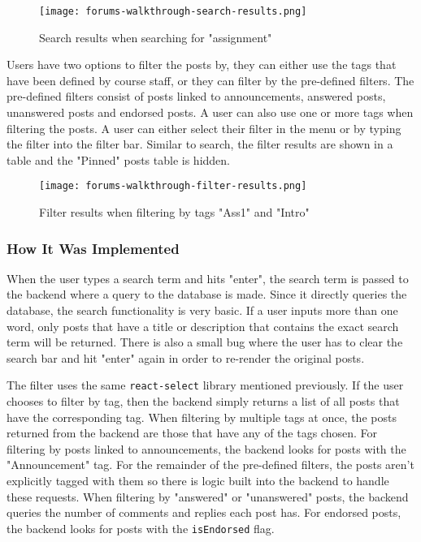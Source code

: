 \begin{figure}[h!]
    \texttt{[image: forums-walkthrough-search-results.png]}
    \centering
    \caption{Search results when searching for "assignment"}
\end{figure}

\newpage

Users have two options to filter the posts by, they can either use the tags that have been defined by course staff, or they can filter by the pre-defined filters.
The pre-defined filters consist of posts linked to announcements, answered posts, unanswered posts and endorsed posts.
A user can also use one or more tags when filtering the posts.
A user can either select their filter in the menu or by typing the filter into the filter bar.
Similar to search, the filter results are shown in a table and the "Pinned" posts table is hidden.

\begin{figure}[h!]
    \texttt{[image: forums-walkthrough-filter-results.png]}
    \centering
    \caption{Filter results when filtering by tags "Ass1" and "Intro"}
\end{figure}

\subsubsection{How It Was Implemented}
When the user types a search term and hits "enter", the search term is passed to the backend where a query to the database is made.
Since it directly queries the database, the search functionality is very basic.
If a user inputs more than one word, only posts that have a title or description that contains the exact search term will be returned.
There is also a small bug where the user has to clear the search bar and hit "enter" again in order to re-render the original posts.

The filter uses the same \texttt{react-select} library mentioned previously.
If the user chooses to filter by tag, then the backend simply returns a list of all posts that have the corresponding tag.
When filtering by multiple tags at once, the posts returned from the backend are those that have any of the tags chosen.
For filtering by posts linked to announcements, the backend looks for posts with the "Announcement" tag.
For the remainder of the pre-defined filters, the posts aren't explicitly tagged with them so there is logic built into the backend to handle these requests.
When filtering by "answered" or "unanswered" posts, the backend queries the number of comments and replies each post has.
For endorsed posts, the backend looks for posts with the \texttt{isEndorsed} flag.

